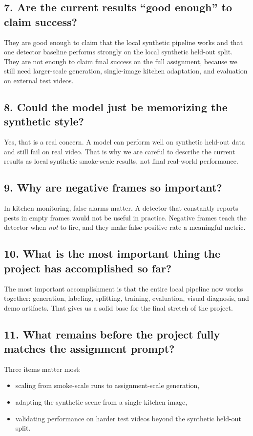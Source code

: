 \documentclass[11pt]{article}
\begin{document}
\subsection*{7. Are the current results ``good enough'' to claim success?}
They are good enough to claim that the local synthetic pipeline works and that one detector baseline performs strongly on the local synthetic held-out split. They are not enough to claim final success on the full assignment, because we still need larger-scale generation, single-image kitchen adaptation, and evaluation on external test videos.

\subsection*{8. Could the model just be memorizing the synthetic style?}
Yes, that is a real concern. A model can perform well on synthetic held-out data and still fail on real video. That is why we are careful to describe the current results as local synthetic smoke-scale results, not final real-world performance.

\subsection*{9. Why are negative frames so important?}
In kitchen monitoring, false alarms matter. A detector that constantly reports pests in empty frames would not be useful in practice. Negative frames teach the detector when \emph{not} to fire, and they make false positive rate a meaningful metric.

\subsection*{10. What is the most important thing the project has accomplished so far?}
The most important accomplishment is that the entire local pipeline now works together: generation, labeling, splitting, training, evaluation, visual diagnosis, and demo artifacts. That gives us a solid base for the final stretch of the project.

\subsection*{11. What remains before the project fully matches the assignment prompt?}
Three items matter most:
\begin{itemize}[leftmargin=1.5em]
    \item scaling from smoke-scale runs to assignment-scale generation,
    \item adapting the synthetic scene from a single kitchen image,
    \item validating performance on harder test videos beyond the synthetic held-out split.
\end{itemize}
\end{document}
